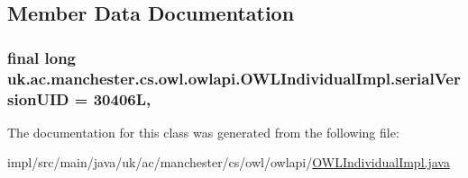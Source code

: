 \subsection{Member Data Documentation}
\hypertarget{classuk_1_1ac_1_1manchester_1_1cs_1_1owl_1_1owlapi_1_1_o_w_l_individual_impl_afd98bee2b4a7930fb1b6186b560a2183}{
\subsubsection[{serial\-Version\-U\-I\-D}]{\setlength{\rightskip}{0pt plus 5cm}final long uk.\-ac.\-manchester.\-cs.\-owl.\-owlapi.\-O\-W\-L\-Individual\-Impl.\-serial\-Version\-U\-I\-D = 30406\-L\hspace{0.3cm}{\ttfamily [static]}, {\ttfamily [private]}}}\label{classuk_1_1ac_1_1manchester_1_1cs_1_1owl_1_1owlapi_1_1_o_w_l_individual_impl_afd98bee2b4a7930fb1b6186b560a2183}


The documentation for this class was generated from the following file\-:\begin{DoxyCompactItemize}
\item 
impl/src/main/java/uk/ac/manchester/cs/owl/owlapi/\hyperlink{_o_w_l_individual_impl_8java}{O\-W\-L\-Individual\-Impl.\-java}\end{DoxyCompactItemize}

